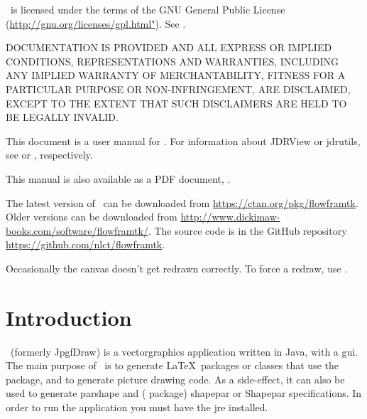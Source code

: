 \subtitle{\bigskip{}\bigskip}


\GlsXtrLoadResources[src={flowframtk,shared,\langbibsrcs},
 \TeXJavaHelpSymbolResourceOptions
]

\GlsXtrLoadResources[src={flowframtk,shared,\langbibsrcs},
 \TeXJavaHelpGlsResourceOptions
]


\maketitle

\FlowframTk\ is licensed under the terms of the GNU General Public License
(\url{http://gnu.org/licenses/gpl.html"}).
See .

DOCUMENTATION IS PROVIDED  AND ALL EXPRESS OR IMPLIED
CONDITIONS, REPRESENTATIONS AND WARRANTIES, INCLUDING ANY
IMPLIED WARRANTY OF MERCHANTABILITY, FITNESS FOR A PARTICULAR
PURPOSE OR NON-INFRINGEMENT, ARE DISCLAIMED, EXCEPT TO THE EXTENT THAT
SUCH DISCLAIMERS ARE HELD TO BE LEGALLY INVALID.

This document is a user manual for \FlowframTk. For information about
JDRView or jdrutils, see  or
, respectively.

\IfTeXParserLib
  {%
    This manual is also available as a PDF document, . 
  }
  {}

The latest version of \FlowframTk\ can be downloaded from
\url{https://ctan.org/pkg/flowframtk}.
Older versions can be downloaded from
\url{http://www.dickimaw-books.com/software/flowframtk/}.
The source code is in the GitHub repository
\url{https://github.com/nlct/flowframtk}.

Occasionally the canvas doesn't get redrawn correctly. To force a
redraw, use .

\frontmatter
\tableofcontents

\mainmatter
\chapter{Introduction}
\label{sec:introduction}

\FlowframTk\ (formerly \gls{JpgfDraw})
is a \gls{vectorgraphics} application written in \gls{Java}, with a 
\gls{gui}.  The main purpose of \FlowframTk\ is to generate \LaTeX\ packages or 
classes that use the  package, and to generate
 picture drawing code. As a side-effect, it can also be
used to generate \gls{parshape} and ( package) \gls{shapepar} or 
\gls{Shapepar} specifications. In order to run the application you 
must have the \gls{jre} installed.

